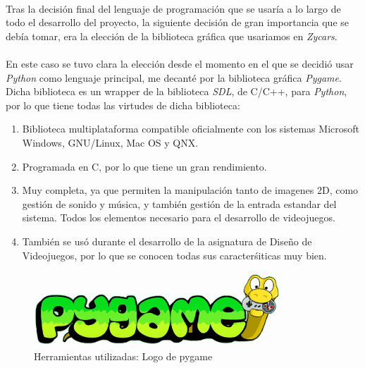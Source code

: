 \paragraph{}
Tras la decisión final del lenguaje de programación que se usaría a lo largo de todo el desarrollo del proyecto, la siguiente
decisión de gran importancia que se debía tomar, era la elección de la biblioteca gráfica que usariamos en \emph{Zycars}.

\paragraph{}
En este caso se tuvo clara la elección desde el momento en el que se decidió usar \emph{Python} como lenguaje principal, me decanté
por la biblioteca gráfica \emph{Pygame}. Dicha biblioteca es un wrapper de la biblioteca \emph{SDL}, de C/C++, para \emph{Python}, por
lo que tiene todas las virtudes de dicha biblioteca:

\begin{enumerate}
    \item Biblioteca multiplataforma compatible oficialmente con los sistemas Microsoft Windows, GNU/Linux, Mac OS y QNX.
    
    \item Programada en C, por lo que tiene un gran rendimiento.
    
    \item Muy completa, ya que permiten la manipulación tanto de imagenes 2D, como gestión de sonido y música, y también gestión
    de la entrada estandar del sistema. Todos los elementos necesario para el desarrollo de videojuegos.
    
    \item También se usó durante el desarrollo de la asignatura de Diseño de Videojuegos, por lo que se conocen todas sus 
    caracterśiticas muy bien.
\end{enumerate}

\begin{figure}[H]
  \label{logo_pygame}
  \begin{center}
    \includegraphics[scale=0.6]{imagenes/logo_pygame.png}
  \end{center}
  \caption{Herramientas utilizadas: Logo de pygame}
\end{figure}

